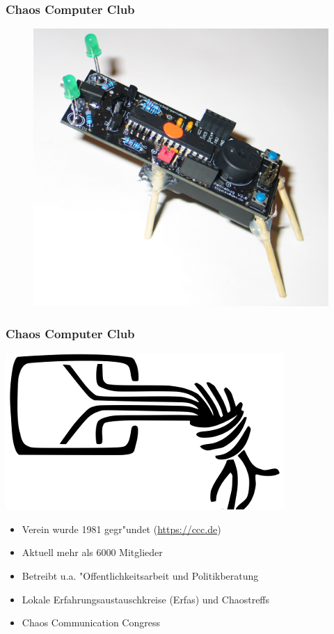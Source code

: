 \documentclass[12pt]{beamer}
\begin{document}
\begin{frame}
  \frametitle{Chaos Computer Club}
  \begin{figure}
    \includegraphics[height=0.7\textheight]{img/pentabug.jpg}
  \end{figure}
\end{frame}

\begin{frame}
    \frametitle{Chaos Computer Club}
    \begin{center}
	\includegraphics[height=0.2\textheight]{img/chaosknoten.png}
    \end{center}	
    \begin{itemize}
      \item<1-> Verein wurde 1981 gegr"undet (\url{https://ccc.de})          
      \item<2-> Aktuell mehr als 6000 Mitglieder
      \item<3-> Betreibt u.a. "Offentlichkeitsarbeit und Politikberatung      
      \item<4-> Lokale Erfahrungsaustauschkreise (Erfas) und Chaostreffs
      \item<5-> Chaos Communication Congress
    \end{itemize}
\end{frame}
\end{document}
